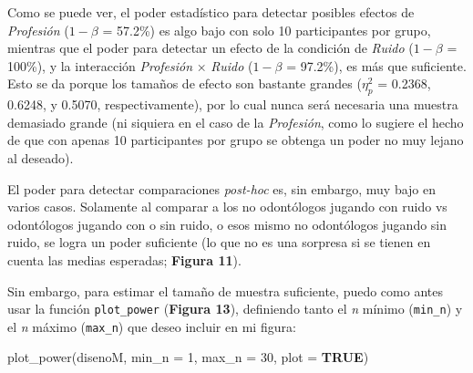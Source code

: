 \documentclass[
]{article}
\newenvironment{Shaded}{\begin{snugshade}}{\end{snugshade}}
\newcommand{\AttributeTok}[1]{\textcolor[rgb]{0.16,0.50,0.73}{#1}}
\newcommand{\ConstantTok}[1]{\textcolor[rgb]{0.15,0.68,0.68}{\textbf{#1}}}
\newcommand{\DecValTok}[1]{\textcolor[rgb]{0.96,0.45,0.00}{#1}}
\newcommand{\FunctionTok}[1]{\textcolor[rgb]{0.56,0.27,0.68}{#1}}
\newcommand{\NormalTok}[1]{\textcolor[rgb]{0.81,0.81,0.76}{#1}}
\begin{document}
Como se puede ver, el poder estadístico para detectar posibles efectos
de \emph{Profesión} (\(1-\beta\) = 57.2\%) es algo bajo con solo 10
participantes por grupo, mientras que el poder para detectar un efecto
de la condición de \emph{Ruido} (\(1-\beta\) = 100\%), y la interacción
\emph{Profesión} × \emph{Ruido} (\(1-\beta\) = 97.2\%), es más que
suficiente. Esto se da porque los tamaños de efecto son bastante grandes
(\(\eta_p^2\) = 0.2368, 0.6248, y 0.5070, respectivamente), por lo cual
nunca será necesaria una muestra demasiado grande (ni siquiera en el
caso de la \emph{Profesión}, como lo sugiere el hecho de que con apenas
10 participantes por grupo se obtenga un poder no muy lejano al
deseado).

El poder para detectar comparaciones \emph{post-hoc} es, sin embargo,
muy bajo en varios casos. Solamente al comparar a los no odontólogos
jugando con ruido vs odontólogos jugando con o sin ruido, o esos mismo
no odontólogos jugando sin ruido, se logra un poder suficiente (lo que
no es una sorpresa si se tienen en cuenta las medias esperadas;
\textbf{Figura 11}).

Sin embargo, para estimar el tamaño de muestra suficiente, puedo como
antes usar la función \texttt{plot\_power} (\textbf{Figura 13}),
definiendo tanto el \emph{n} mínimo (\texttt{min\_n}) y el \emph{n}
máximo (\texttt{max\_n}) que deseo incluir en mi figura:

\begin{Shaded}
\begin{Highlighting}[]
\FunctionTok{plot\_power}\NormalTok{(disenoM,}
           \AttributeTok{min\_n =} \DecValTok{1}\NormalTok{,}
           \AttributeTok{max\_n =} \DecValTok{30}\NormalTok{,}
           \AttributeTok{plot =} \ConstantTok{TRUE}\NormalTok{)}
\end{Highlighting}
\end{Shaded}
\end{document}
